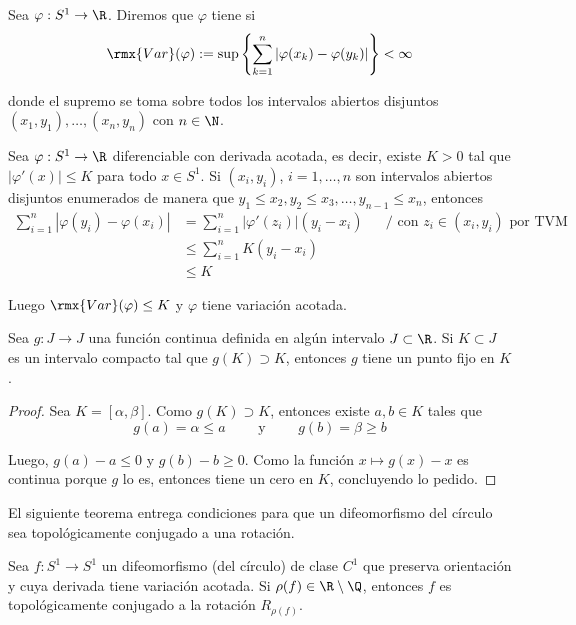 \documentclass[	docname= Sistemas\ Din\'amicos,
				finished=1,
				semester=1,
				year=2017,
				professor=Godofredo\ Iommi,
				sigla=MAT2565]{apunte}
\begin{document}
\begin{defn} Sea $\varphi: S^{1} \to \R$. Diremos que $\varphi$ tiene  si
	$$\rmx{Var}(\varphi) := \sup \left\{ \sum_{k=1}^{n} |\varphi(x_{k}) - \varphi(y_{k}) | \right\} < \infty$$
	
donde el supremo se toma sobre todos los intervalos abiertos disjuntos $(x_{1}, y_{1}), \ldots, (x_{n}, y_{n})$ con $n \in \N$.
\end{defn}

\begin{ex} Sea $\varphi: S^{1} \to \R$ diferenciable con derivada acotada, es decir, existe $K > 0$ tal que $|\varphi'(x)| \leq K$ para todo $x \in S^{1}$. Si $(x_{i}, y_{i})$, $i = 1,\ldots,n$ son intervalos abiertos disjuntos enumerados de manera que $y_{1} \leq x_{2}, y_{2} \leq x_{3}, \ldots, y_{n-1} \leq x_{n}$, entonces
	\begin{align*}
		\sum_{i=1}^{n} |\varphi(y_{i}) - \varphi(x_{i})|
			&=	\sum_{i=1}^{n} |\varphi'(z_{i})|(y_{i} - x_{i})		&&\big/ \text{ con } z_{i} \in (x_{i}, y_{i}) \text{ por TVM}	\\
			&\leq	\sum_{i=1}^{n} K(y_{i} - x_{i})	\\
			&\leq	K
	\end{align*}

Luego $\rmx{Var}(\varphi) \leq K$ y $\varphi$ tiene variación acotada.
\end{ex}

\begin{lem}  Sea $g: J \to J$ una función continua definida en algún intervalo $J \subset \R$. Si $K \subset J$ es un intervalo compacto tal que $g(K) \supset K$, entonces $g$ tiene un punto fijo en $K$.
\end{lem}

\begin{proof} Sea $K = [\alpha, \beta]$. Como $g(K) \supset K$, entonces existe $a, b \in K$ tales que
	$$g(a) = \alpha \leq a \qquad \text{ y } \qquad g(b) = \beta \geq b$$

Luego, $g(a) - a \leq 0$ y $g(b) - b \geq 0$. Como la función $x \mapsto g(x) - x$ es continua porque $g$ lo es, entonces tiene un cero en $K$, concluyendo lo pedido.
\end{proof}

El siguiente teorema entrega condiciones para que un difeomorfismo del círculo sea topológicamente conjugado a una rotación.

\begin{teo}[Denjoy] Sea $f: S^{1} \to S^{1}$ un difeomorfismo (del círculo) de clase $C^{1}$ que preserva orientación y cuya derivada tiene variación acotada. Si $\rho(f) \in \R \setminus \Q$, entonces $f$ es topológicamente conjugado a la rotación $R_{\rho(f)}$.
\end{teo}
\end{document}

